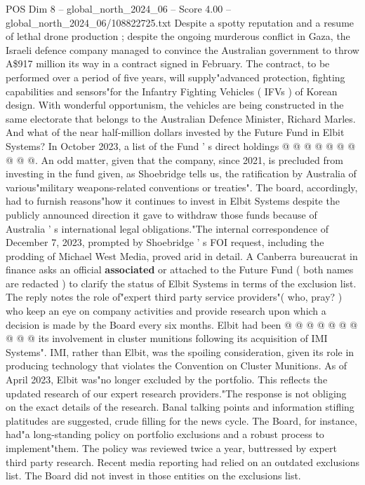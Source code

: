 \begin{textsample}{POS Dim 8 – global\_north\_2024\_06 – Score 4.00 – global\_north\_2024\_06/108822725.txt}
Despite a spotty reputation and a resume of lethal drone production ; despite the ongoing murderous conflict in Gaza, the Israeli defence company managed to convince the Australian government to throw A\$917 million its way in a contract signed in February.
The contract, to be performed over a period of five years, will supply"advanced protection, fighting capabilities and sensors"for the Infantry Fighting Vehicles ( IFVs ) of Korean design.
With wonderful opportunism, the vehicles are being constructed in the same electorate that belongs to the Australian Defence Minister, Richard Marles.
And what of the near half-million dollars invested by the Future Fund in Elbit Systems?
In October 2023, a list of the Fund ' s direct holdings @ @ @ @ @ @ @ @ @ @.
An odd matter, given that the company, since 2021, is precluded from investing in the fund given, as Shoebridge tells us, the ratification by Australia of various"military weapons-related conventions or treaties".
The board, accordingly, had to furnish reasons"how it continues to invest in Elbit Systems despite the publicly announced direction it gave to withdraw those funds because of Australia ' s international legal obligations."The internal correspondence of December 7, 2023, prompted by Shoebridge ' s FOI request, including the prodding of Michael West Media, proved arid in detail.
A Canberra bureaucrat in finance asks an official \textbf{associated} or attached to the Future Fund ( both names are redacted ) to clarify the status of Elbit Systems in terms of the exclusion list.
The reply notes the role of"expert third party service providers"( who, pray? ) who keep an eye on company activities and provide research upon which a decision is made by the Board every six months.
Elbit had been @ @ @ @ @ @ @ @ @ @ its involvement in cluster munitions following its acquisition of IMI Systems".
IMI, rather than Elbit, was the spoiling consideration, given its role in producing technology that violates the Convention on Cluster Munitions.
As of April 2023, Elbit was"no longer excluded by the portfolio.
This reflects the updated research of our expert research providers."The response is not obliging on the exact details of the research.
Banal talking points and information stifling platitudes are suggested, crude filling for the news cycle.
The Board, for instance, had"a long-standing policy on portfolio exclusions and a robust process to implement"them.
The policy was reviewed twice a year, buttressed by expert third party research.
Recent media reporting had relied on an outdated exclusions list.
The Board did not invest in those entities on the exclusions list.

\end{textsample}
